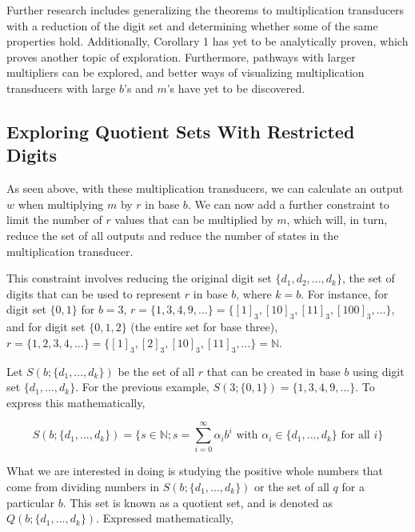 \documentclass{article}
\begin{document}
Further research includes generalizing the theorems to multiplication transducers with a reduction of the digit set and determining whether some of the same properties hold. Additionally, Corollary 1 has yet to be analytically proven, which proves another topic of exploration. Furthermore, pathways with larger multipliers can be explored, and better ways of visualizing multiplication transducers with large $b$'s and $m$'s have yet to be discovered.

\subsection{Exploring Quotient Sets With Restricted Digits}

\hspace*{5mm} As seen above, with these multiplication transducers, we can calculate an output $w$ when multiplying $m$ by $r$ in base $b$. We can now add a further constraint to limit the number of $r$ values that can be multiplied by $m$, which will, in turn, reduce the set of all outputs and reduce the number of states in the multiplication transducer. \vspace{\baselineskip}

This constraint involves reducing the original digit set $\{d_1, d_2, ..., d_k\}$, the set of digits that can be used to represent $r$ in base $b$, where $ k = b$. For instance, for digit set $\{0, 1\}$ for $b = 3$, $r = \{1, 3, 4, 9, ...\} = \{[1]_3, [10]_3, [11]_3, [100]_3, ...\}$, and for digit set $\{0, 1, 2\}$ (the entire set for base three), $r = \{1, 2, 3, 4, ...\} = \{[1]_3, [2]_3, [10]_3, [11]_3, ...\} = \mathbb{N}$. \vspace{\baselineskip}

Let $S (b; \{d_1, ..., d_k\})$ be the set of all $r$ that can be created in base $b$ using digit set $\{d_1, ..., d_k\}$. For the previous example, $S (3; \{0, 1\}) = \{1, 3, 4, 9, ...\} $. To express this mathematically,

\begin{equation} S (b; \{d_1, ..., d_k\}) = \{s \in \mathbb{N}; s = \sum_{i=0}^{\infty} \alpha_i b^i \text{ with } \alpha_i \in \{d_1, ..., d_k\} \text{ for all } i \} \end{equation}

What we are interested in doing is studying the positive whole numbers that come from dividing numbers in $S (b; \{d_1, ..., d_k\})$ or the set of all $q$ for a particular $b$. This set is known as a quotient set, and is denoted as $Q (b; \{d_1, ..., d_k\})$. Expressed mathematically,
\end{document}
